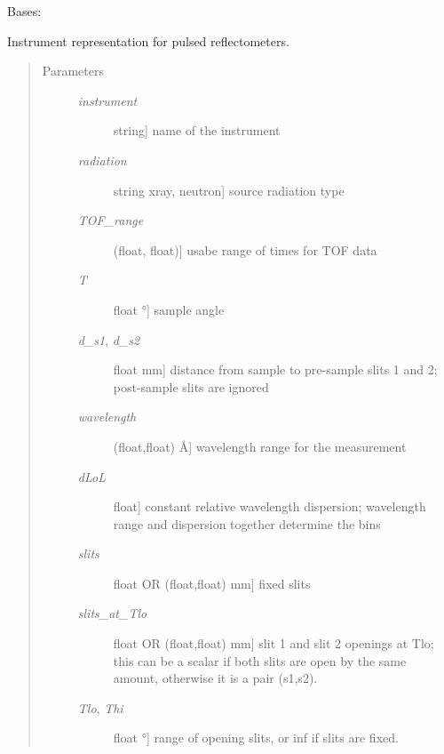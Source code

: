 \documentclass[letterpaper,10pt,english]{sphinxmanual}
\begin{document}

\begin{fulllineitems}
\label{api/instrument:refl1d.instrument.Pulsed}
Bases: 

Instrument representation for pulsed reflectometers.
\begin{quote}\begin{description}
\item[{Parameters }] \leavevmode\begin{description}
\item[{\emph{instrument}}] \leavevmode{[}string{]}
name of the instrument

\item[{\emph{radiation}}] \leavevmode{[}string \textbar{} xray, neutron{]}
source radiation type

\item[{\emph{TOF\_range}}] \leavevmode{[}(float, float){]}
usabe range of times for TOF data

\item[{\emph{T}}] \leavevmode{[}float \textbar{} °{]}
sample angle

\item[{\emph{d\_s1}, \emph{d\_s2}}] \leavevmode{[}float \textbar{} mm{]}
distance from sample to pre-sample slits 1 and 2; post-sample
slits are ignored

\item[{\emph{wavelength}}] \leavevmode{[}(float,float) \textbar{} Å{]}
wavelength range for the measurement

\item[{\emph{dLoL}}] \leavevmode{[}float{]}
constant relative wavelength dispersion; wavelength range and
dispersion together determine the bins

\item[{\emph{slits}}] \leavevmode{[}float OR (float,float) \textbar{} mm{]}
fixed slits

\item[{\emph{slits\_at\_Tlo}}] \leavevmode{[}float OR (float,float) \textbar{} mm{]}
slit 1 and slit 2 openings at Tlo; this can be a scalar if both
slits are open by the same amount, otherwise it is a pair (s1,s2).

\item[{\emph{Tlo}, \emph{Thi}}] \leavevmode{[}float \textbar{} °{]}
range of opening slits, or inf if slits are fixed.


\end{description}
\end{description}
\end{quote}
\end{fulllineitems}
\end{document}

